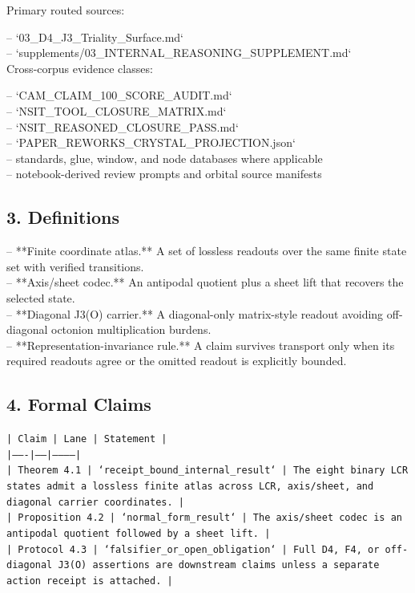 \documentclass[11pt]{article}
\begin{document}
Primary routed sources:

\noindent{}-- `03\_D4\_J3\_Triality\_Surface.md`\\
\noindent{}-- `supplements/03\_INTERNAL\_REASONING\_SUPPLEMENT.md`\\

Cross-corpus evidence classes:

\noindent{}-- `CAM\_CLAIM\_100\_SCORE\_AUDIT.md`\\
\noindent{}-- `NSIT\_TOOL\_CLOSURE\_MATRIX.md`\\
\noindent{}-- `NSIT\_REASONED\_CLOSURE\_PASS.md`\\
\noindent{}-- `PAPER\_REWORKS\_CRYSTAL\_PROJECTION.json`\\
\noindent{}-- standards, glue, window, and node databases where applicable\\
\noindent{}-- notebook-derived review prompts and orbital source manifests\\

\subsection*{3. Definitions}

\noindent{}-- **Finite coordinate atlas.** A set of lossless readouts over the same finite state set with verified transitions.\\
\noindent{}-- **Axis/sheet codec.** An antipodal quotient plus a sheet lift that recovers the selected state.\\
\noindent{}-- **Diagonal J3(O) carrier.** A diagonal-only matrix-style readout avoiding off-diagonal octonion multiplication burdens.\\
\noindent{}-- **Representation-invariance rule.** A claim survives transport only when its required readouts agree or the omitted readout is explicitly bounded.\\

\subsection*{4. Formal Claims}

\noindent\texttt{| Claim | Lane | Statement |}\\
\noindent\texttt{|-------|------|-----------|}\\
\noindent\texttt{| Theorem 4.1 | `receipt\_bound\_internal\_result` | The eight binary LCR states admit a lossless finite atlas across LCR, axis/sheet, and diagonal carrier coordinates. |}\\
\noindent\texttt{| Proposition 4.2 | `normal\_form\_result` | The axis/sheet codec is an antipodal quotient followed by a sheet lift. |}\\
\noindent\texttt{| Protocol 4.3 | `falsifier\_or\_open\_obligation` | Full D4, F4, or off-diagonal J3(O) assertions are downstream claims unless a separate action receipt is attached. |}\\
\end{document}

